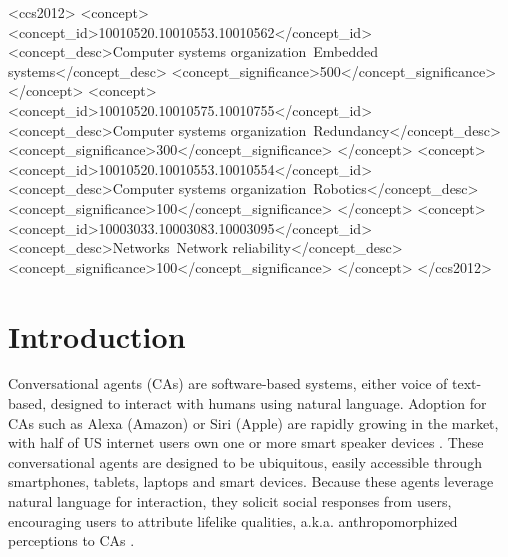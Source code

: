 \documentclass[sigconf,screen,review, anonymous]{acmart}
\begin{document}
\begin{CCSXML}
<ccs2012>
 <concept>
  <concept_id>10010520.10010553.10010562</concept_id>
  <concept_desc>Computer systems organization~Embedded systems</concept_desc>
  <concept_significance>500</concept_significance>
 </concept>
 <concept>
  <concept_id>10010520.10010575.10010755</concept_id>
  <concept_desc>Computer systems organization~Redundancy</concept_desc>
  <concept_significance>300</concept_significance>
 </concept>
 <concept>
  <concept_id>10010520.10010553.10010554</concept_id>
  <concept_desc>Computer systems organization~Robotics</concept_desc>
  <concept_significance>100</concept_significance>
 </concept>
 <concept>
  <concept_id>10003033.10003083.10003095</concept_id>
  <concept_desc>Networks~Network reliability</concept_desc>
  <concept_significance>100</concept_significance>
 </concept>
</ccs2012>
\end{CCSXML}




\maketitle

\section{Introduction}

Conversational agents (CAs) are software-based systems, either voice of text-based, designed to interact with humans using natural language. Adoption for CAs such as Alexa (Amazon) or Siri (Apple) are rapidly growing in the market, with half of US internet users own one or more smart speaker devices \cite{2022comscore}. These conversational agents are designed to be ubiquitous, easily accessible through smartphones, tablets, laptops and smart devices. Because these agents leverage natural language for interaction, they solicit social responses from users, encouraging users to attribute lifelike qualities, a.k.a. anthropomorphized perceptions to CAs \cite{eyssel2012if}.
\end{document}
